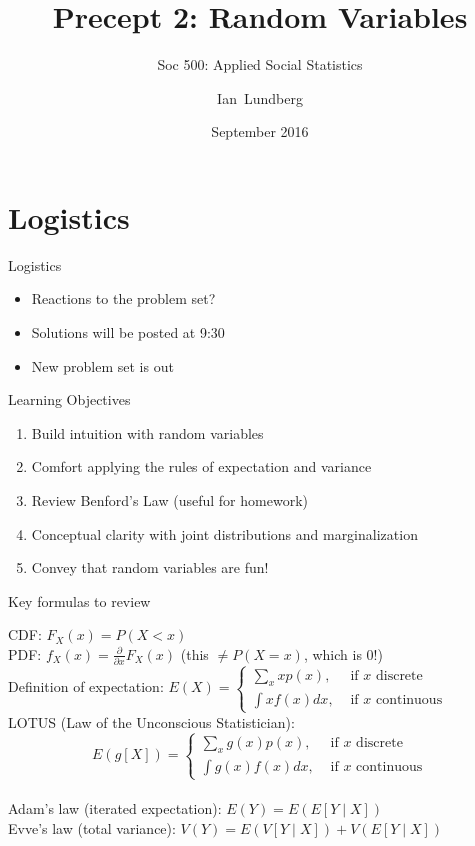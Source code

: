 \documentclass{beamer}
\title{Precept 2: Random Variables}
\subtitle{Soc 500: Applied Social Statistics}
\author{Ian~Lundberg}
\institute[Princeton]{Princeton University}
\date{September 2016}
\begin{document}
\begin{frame}
  \titlepage
\end{frame}

\section{Logistics}
\begin{frame}{Logistics}
\begin{itemize}
  \item Reactions to the problem set?
  \item Solutions will be posted at 9:30
  \item New problem set is out
\end{itemize}
\end{frame}

\begin{frame}{Learning Objectives}
\begin{enumerate}
  \item Build intuition with random variables
  \item Comfort applying the rules of expectation and variance
  \item Review Benford's Law (useful for homework)
  \item Conceptual clarity with joint distributions and marginalization
  \item Convey that random variables are fun!
\end{enumerate}
\end{frame}

\begin{frame}{Key formulas to review}
\begin{footnotesize}
CDF: $F_X(x)=P(X<x)$ \\
\medskip
PDF: $f_X(x)=\frac{\partial}{\partial x}F_X(x)$ (this $\neq P(X=x)$, which is 0!) \\
\medskip
Definition of expectation: $E(X)=\begin{cases}\sum_x xp(x),& \text{ if }x\text{ discrete} \\
\int x f(x) dx,&\text{ if }x\text{ continuous}\end{cases}$ \\
\medskip
LOTUS (Law of the Unconscious Statistician):
$$E(g[X])=\begin{cases}\sum_x g(x)p(x),& \text{ if }x\text{ discrete} \\
\int g(x) f(x) dx,&\text{ if }x\text{ continuous}\end{cases}$$ \\
\medskip
Adam's law (iterated expectation): $E(Y)=E(E[Y\mid X])$ \\
\medskip
Evve's law (total variance): $V(Y)=E(V[Y\mid X])+V(E[Y\mid X])$
\end{footnotesize}
\end{frame}
\end{document}
